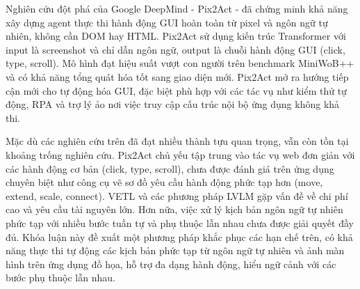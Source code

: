 \documentclass[a4paper, 12pt]{report}
\begin{document}
{Nghiên cứu đột phá của Google DeepMind - Pix2Act \cite{shaw2023pixelsuiactionslearning} - đã chứng minh khả năng xây dựng agent thực thi hành động GUI hoàn toàn từ pixel và ngôn ngữ tự nhiên, không cần DOM hay HTML. Pix2Act sử dụng kiến trúc Transformer với input là screenshot và chỉ dẫn ngôn ngữ, output là chuỗi hành động GUI (click, type, scroll). Mô hình đạt hiệu suất vượt con người trên benchmark MiniWoB++ và có khả năng tổng quát hóa tốt sang giao diện mới. Pix2Act mở ra hướng tiếp cận mới cho tự động hóa GUI, đặc biệt phù hợp với các tác vụ như kiểm thử tự động, RPA và trợ lý ảo nơi việc truy cập cấu trúc nội bộ ứng dụng không khả thi.

Mặc dù các nghiên cứu trên đã đạt nhiều thành tựu quan trọng, vẫn còn tồn tại khoảng trống nghiên cứu. Pix2Act chủ yếu tập trung vào tác vụ web đơn giản với các hành động cơ bản (click, type, scroll), chưa được đánh giá trên ứng dụng chuyên biệt như công cụ vẽ sơ đồ yêu cầu hành động phức tạp hơn (move, extend, scale, connect). VETL và các phương pháp LVLM gặp vấn đề về chi phí cao và yêu cầu tài nguyên lớn. Hơn nữa, việc xử lý kịch bản ngôn ngữ tự nhiên phức tạp với nhiều bước tuần tự và phụ thuộc lẫn nhau chưa được giải quyết đầy đủ. Khóa luận này đề xuất một phương pháp khắc phục các hạn chế trên, có khả năng thực thi tự động các kịch bản phức tạp từ ngôn ngữ tự nhiên và ảnh màn hình trên ứng dụng đồ họa, hỗ trợ đa dạng hành động, hiểu ngữ cảnh với các bước phụ thuộc lẫn nhau.



}
\end{document}
